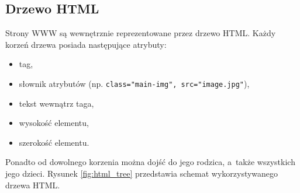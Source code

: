 \documentclass[a4paper,11pt]{article}
\begin{document}


\subsection{Drzewo HTML}

Strony WWW są wewnętrznie reprezentowane przez drzewo HTML. Każdy korzeń drzewa posiada następujące atrybuty:

\begin{itemize}
    \item tag,
    \item słownik atrybutów (np. \verb+class="main-img", src="image.jpg"+),
    \item tekst wewnątrz taga,
    \item wysokość elementu,
    \item szerokość elementu.
\end{itemize}

Ponadto od dowolnego korzenia można dojść do jego rodzica, a~także wszystkich jego dzieci. Rysunek \ref{fig:html_tree} przedstawia schemat wykorzystywanego drzewa HTML.
\end{document}
